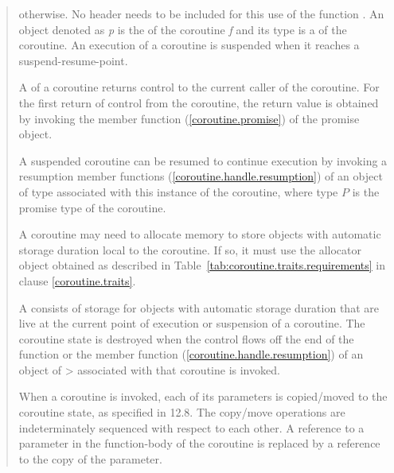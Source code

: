 \begin{quote}
otherwise. 
No header needs to be included for this use of the function .
An object denoted as \textit{p} is the  of
the coroutine \textit{f} and its type is a 
of the coroutine.
An execution of a coroutine is suspended when it reaches a suspend-resume-point.

\pnum 
A  of a coroutine returns control to the current
caller of the coroutine. For the first return of control from the coroutine, the return value is obtained by invoking the member function 
 (\ref{coroutine.promise})
of the promise object.


\pnum
A suspended coroutine can be resumed
to continue execution by invoking
a resumption member functions (\ref{coroutine.handle.resumption}) of an object of  type
associated with this instance of the coroutine, where type $P$
is the promise type of the coroutine. 

\pnum
A coroutine may need to allocate
memory to store objects with automatic storage duration
local to the coroutine. If so, it must
use the allocator object obtained as described in 
Table~\ref{tab:coroutine.traits.requirements} in clause \ref{coroutine.traits}.

\pnum
A  consists of 
storage for objects with automatic storage duration
that are live at the current point of execution or suspension of 
a coroutine.
The coroutine state is destroyed when
the control flows off the end of the function or
the  member function (\ref{coroutine.handle.resumption}) of an object of > associated with that coroutine is invoked.


\pnum
When a coroutine is invoked, each of its parameters is copied/moved to the coroutine state, as specified in 12.8.  The copy/move operations are indeterminately sequenced with respect to each other.
A reference to a parameter in the function-body of the coroutine is replaced by a reference to the copy of the parameter.


\end{quote}
